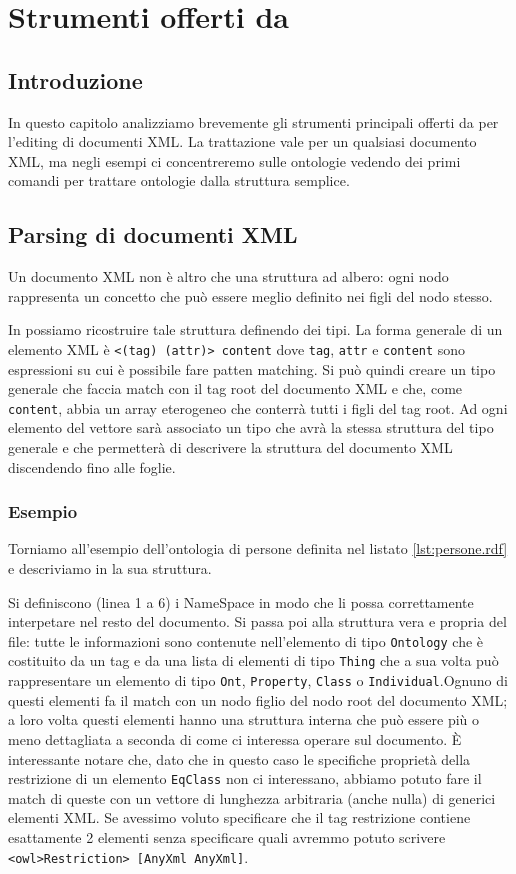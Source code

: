 \chapter{Strumenti offerti da \cduce}
\section*{Introduzione}
In questo capitolo analizziamo brevemente gli strumenti principali offerti da \cduce per l'editing di documenti XML. La trattazione vale per un qualsiasi documento XML, ma negli esempi ci concentreremo sulle ontologie vedendo dei primi comandi per trattare ontologie dalla struttura semplice. 


\section{Parsing di documenti XML}
Un documento XML non è altro che una struttura ad albero: ogni nodo rappresenta un concetto che può essere meglio definito nei figli del nodo stesso. 

In \cduce possiamo ricostruire tale struttura definendo dei tipi. La forma generale di un elemento XML è \verb|<(tag) (attr)> content| dove \verb|tag|, \verb|attr| e \verb|content| sono espressioni su cui è possibile fare patten matching. Si può quindi creare un tipo generale che faccia match con il tag root del documento XML e che, come \verb|content|, abbia un array eterogeneo che conterrà tutti i figli del tag root. Ad ogni elemento del vettore sarà associato un tipo che avrà la stessa struttura del tipo generale e che permetterà di descrivere la struttura del documento XML discendendo fino alle foglie.
\subsection{Esempio}
Torniamo all'esempio dell'ontologia di persone definita nel listato \ref{lst:persone.rdf} e descriviamo in \cduce la sua struttura.

Si definiscono (linea 1 a 6) i NameSpace in modo che \cduce li possa correttamente interpetare nel resto del documento. Si passa poi alla struttura vera e propria del file: tutte le informazioni sono contenute nell'elemento di tipo \verb|Ontology| che è costituito da un tag e da una lista di elementi di tipo \verb|Thing| che a sua volta può rappresentare un elemento di tipo \verb|Ont|, \verb|Property|, \verb|Class| o \verb|Individual|.Ognuno di questi elementi fa il match con un nodo figlio del nodo root del documento XML; a loro volta questi elementi hanno una struttura interna che può essere più o meno dettagliata a seconda di come ci interessa operare sul documento. È interessante notare che, dato che in questo caso le specifiche proprietà della restrizione di un elemento \verb|EqClass| non ci interessano, abbiamo potuto fare il match di queste con un vettore di lunghezza arbitraria (anche nulla) di generici elementi XML. Se avessimo voluto specificare che il tag restrizione contiene esattamente 2 elementi senza specificare quali avremmo potuto scrivere \verb|<owl>Restriction> [AnyXml AnyXml]|.

